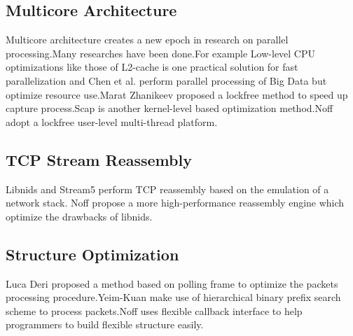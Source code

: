 \documentclass[conference]{IEEEtran}
\begin{document}
\subsection{Multicore Architecture}
Multicore architecture creates a new epoch in research on parallel processing.Many researches have been done.For example Low-level CPU optimizations like those of
L2-cache is one practical solution for fast parallelization\cite{IEEE:15} and Chen et al. \cite{IEEE:16} perform parallel processing of Big Data but optimize resource use.Marat Zhanikeev\cite{IEEE:17} proposed a lockfree method to speed up capture process.Scap\cite{IEEE:12} is another kernel-level based optimization method.Noff adopt a lockfree user-level multi-thread platform.
\subsection{TCP Stream Reassembly}
Libnids\cite{IEEE:11} and Stream5\cite{IEEE:18} perform TCP reassembly based on the emulation of a network stack. Noff propose a more high-performance reassembly engine which optimize the drawbacks of libnids.


\subsection{Structure Optimization}
Luca Deri\cite{IEEE:19} proposed a method based on polling frame to optimize the packets processing procedure.Yeim-Kuan\cite{IEEE:20} make use of hierarchical binary prefix search scheme to process packets.Noff uses flexible callback interface to help programmers to build flexible structure easily.
\end{document}
